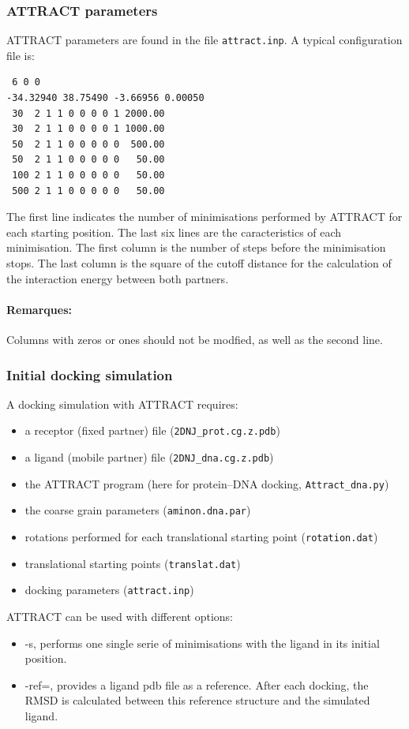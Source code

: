 \documentclass[12pt,a4paper]{article}
\begin{document}
\subsubsection{ATTRACT parameters}

ATTRACT parameters are found in the file {\tt attract.inp}. A typical configuration file is:
\begin{verbatim}
 6 0 0
-34.32940 38.75490 -3.66956 0.00050
 30  2 1 1 0 0 0 0 1 2000.00
 30  2 1 1 0 0 0 0 1 1000.00
 50  2 1 1 0 0 0 0 0  500.00
 50  2 1 1 0 0 0 0 0   50.00
 100 2 1 1 0 0 0 0 0   50.00
 500 2 1 1 0 0 0 0 0   50.00
\end{verbatim}

The first line indicates the number of minimisations performed by ATTRACT for each starting position. The last six lines are the caracteristics of each minimisation. The first column is the number of steps before the minimisation stops. The last column is the square of the cutoff distance for the calculation of the interaction energy between both partners.

\paragraph{Remarques:} Columns with zeros or ones should not be modfied, as well as the second line.

\subsubsection{Initial docking simulation}

A docking simulation with ATTRACT requires:
\begin{itemize}
\item a receptor (fixed partner) file ({\tt 2DNJ\_prot.cg.z.pdb})
\item a ligand (mobile partner) file ({\tt 2DNJ\_dna.cg.z.pdb})
\item the ATTRACT program (here for protein--DNA docking, {\tt  Attract\_dna.py})
\item the coarse grain parameters ({\tt aminon.dna.par})
\item rotations performed for each translational starting point ({\tt rotation.dat})
\item translational starting points ({\tt translat.dat})
\item docking parameters ({\tt attract.inp})
\end{itemize}

ATTRACT can be used with different options:
\begin{itemize}
\item -s, performs one single serie of minimisations with the ligand in its initial position.
\item -ref=, provides a ligand pdb file as a reference. After each docking, the RMSD is calculated between this reference structure and the simulated ligand.
\end{itemize}
\end{document}
